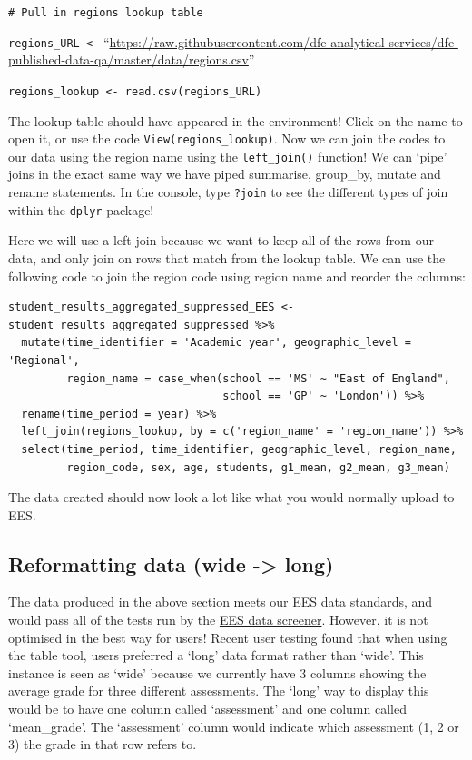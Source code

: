 \documentclass[
  12pt,
]{article}
\begin{document}
\texttt{\#\ Pull\ in\ regions\ lookup\ table}

\texttt{regions\_URL\ \textless{}-}
``\url{https://raw.githubusercontent.com/dfe-analytical-services/dfe-published-data-qa/master/data/regions.csv}''

\texttt{regions\_lookup\ \textless{}-\ read.csv(regions\_URL)}

The lookup table should have appeared in the environment! Click on the
name to open it, or use the code \texttt{View(regions\_lookup)}. Now we
can join the codes to our data using the region name using the
\texttt{left\_join()} function! We can `pipe' joins in the exact same
way we have piped summarise, group\_by, mutate and rename statements. In
the console, type \texttt{?join} to see the different types of join
within the \texttt{dplyr} package!

Here we will use a left join because we want to keep all of the rows
from our data, and only join on rows that match from the lookup table.
We can use the following code to join the region code using region name
and reorder the columns:

\begin{verbatim}
student_results_aggregated_suppressed_EES <- student_results_aggregated_suppressed %>%
  mutate(time_identifier = 'Academic year', geographic_level = 'Regional',
         region_name = case_when(school == 'MS' ~ "East of England",
                                 school == 'GP' ~ 'London')) %>%
  rename(time_period = year) %>%
  left_join(regions_lookup, by = c('region_name' = 'region_name')) %>%
  select(time_period, time_identifier, geographic_level, region_name, 
         region_code, sex, age, students, g1_mean, g2_mean, g3_mean)
\end{verbatim}

The data created should now look a lot like what you would normally
upload to EES.

\hypertarget{reformatting-data-wide---long}{%
\subsection{Reformatting data (wide -\textgreater{}
long)}\label{reformatting-data-wide---long}}

The data produced in the above section meets our EES data standards, and
would pass all of the tests run by the
\href{https://rsconnect/rsc/dfe-published-data-qa/}{EES data screener}.
However, it is not optimised in the best way for users! Recent user
testing found that when using the table tool, users preferred a `long'
data format rather than `wide'. This instance is seen as `wide' because
we currently have 3 columns showing the average grade for three
different assessments. The `long' way to display this would be to have
one column called `assessment' and one column called `mean\_grade'. The
`assessment' column would indicate which assessment (1, 2 or 3) the
grade in that row refers to.
\end{document}
